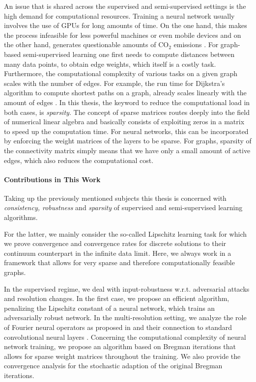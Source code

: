 An issue that is shared across the supervised and semi-supervised settings is the high demand for computational resources. Training a neural network usually involves the use of GPUs for long amounts of time. On the one hand, this makes the process infeasible for less powerful machines or even mobile devices and on the other hand, generates questionable amounts of $\mathrm{CO_2}$ emissions \cite{hoefler2021sparsity}. For graph-based semi-supervised learning one first needs to compute distances between many data points, to obtain edge weights, which itself is a costly task. Furthermore, the computational complexity of various tasks on a given graph scales with the number of edges. For example, the run time for Dijkstra's algorithm to compute shortest paths on a graph, already scales linearly with the amount of edges \cite{dijkstra2022note}. In this thesis, the keyword to reduce the computational load in both cases, is \textit{sparsity}. The concept of sparse matrices routes deeply into the field of numerical linear algebra \cite{lanczos1952solution,golub2013matrix} and basically consists of exploiting zeros in a matrix to speed up the computation time. For neural networks, this can be incorporated by enforcing the weight matrices of the layers to be sparse. For graphs, sparsity of the connectivity matrix simply means that we have only a small amount of active edges, which also reduces the computational cost.
%
%
\paragraph{Contributions in This Work}
%
Taking up the previously mentioned subjects this thesis is concerned with \textit{consistency, robustness} and \textit{sparsity} of supervised and semi-supervised learning algorithms. 

For the latter, we mainly consider the so-called Lipschitz learning task \cite{nadler2009statistical} for which we prove convergence and convergence rates for discrete solutions to their continuum counterpart in the infinite data limit. Here, we always work in a framework that allows for very sparse and therefore computationally feasible graphs.

In the supervised regime, we deal with input-robustness w.r.t. adversarial attacks and resolution changes. In the first case, we propose an efficient algorithm, penalizing the Lipschitz constant \cite{lipschitz1877lehrbuch} of a neural network, which trains an adversarially robust network. In the multi-resolution setting, we analyze the role of Fourier neural operators as proposed in \cite{li2020fourier} and their connection to standard convolutional neural layers \cite{fukushima1980neocognitron}. Concerning the computational complexity of neural network training, we propose an algorithm based on Bregman iterations \cite{osher2005iterative} that allows for sparse weight matrices throughout the training. We also provide the convergence analysis for the stochastic adaption of the original Bregman iterations.

